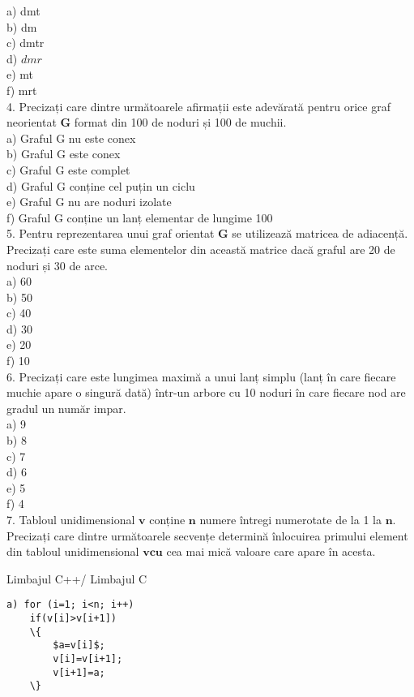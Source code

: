 a) dmt\\
b) dm\\
c) dmtr\\
d) $d m r$\\
e) mt\\
f) mrt\\
4. Precizați care dintre următoarele afirmații este adevărată pentru orice graf neorientat $\mathbf{G}$ format din 100 de noduri și 100 de muchii.\\
a) Graful G nu este conex\\
b) Graful G este conex\\
c) Graful G este complet\\
d) Graful G conține cel puțin un ciclu\\
e) Graful G nu are noduri izolate\\
f) Graful G conține un lanț elementar de lungime 100\\
5. Pentru reprezentarea unui graf orientat $\mathbf{G}$ se utilizează matricea de adiacență. Precizați care este suma elementelor din această matrice dacă graful are 20 de noduri și 30 de arce.\\
a) 60\\
b) 50\\
c) 40\\
d) 30\\
e) 20\\
f) 10\\
6. Precizați care este lungimea maximă a unui lanț simplu (lanț în care fiecare muchie apare o singură dată) într-un arbore cu 10 noduri în care fiecare nod are gradul un număr impar.\\
a) 9\\
b) 8\\
c) 7\\
d) 6\\
e) 5\\
f) 4\\
7. Tabloul unidimensional $\mathbf{v}$ conține $\mathbf{n}$ numere întregi numerotate de la 1 la $\mathbf{n}$. Precizați care dintre următoarele secvențe determină înlocuirea primului element din tabloul unidimensional $\mathbf{v} \mathbf{c u}$ cea mai mică valoare care apare în acesta.

Limbajul C++/ Limbajul C

\begin{verbatim}
a) for (i=1; i<n; i++)
    if(v[i]>v[i+1])
    \{
        $a=v[i]$;
        v[i]=v[i+1];
        v[i+1]=a;
    \}
\end{verbatim}

